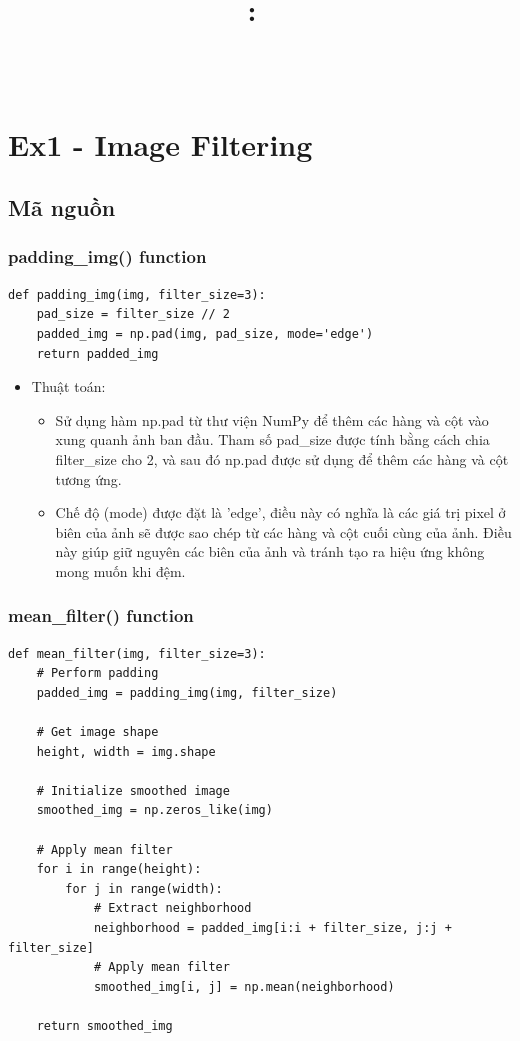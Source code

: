 \documentclass{article}
\title{
\vspace{-1in}
\textmd{\textbf{\hmwkClass:\ \hmwkTitle} \\ \hmwkAuthorName}\\
}
\author{}
\date{}
\begin{document}
\maketitle

\section{Ex1 - Image Filtering}
\subsection{Mã nguồn}
\subsubsection{padding\_img() function}
\begin{lstlisting}[caption={Code of padding\_img() function}, label={padding\_img}]
def padding_img(img, filter_size=3):
    pad_size = filter_size // 2
    padded_img = np.pad(img, pad_size, mode='edge')
    return padded_img
\end{lstlisting}

\begin{itemize}
    
    \item Thuật toán:
    \begin{itemize}
        \item Sử dụng hàm np.pad từ thư viện NumPy để thêm các hàng và cột vào xung quanh ảnh ban đầu. Tham số pad\_size được tính bằng cách chia filter\_size cho 2, và sau đó np.pad được sử dụng để thêm các hàng và cột tương ứng.
        \item Chế độ (mode) được đặt là 'edge', điều này có nghĩa là các giá trị pixel ở biên của ảnh sẽ được sao chép từ các hàng và cột cuối cùng của ảnh. Điều này giúp giữ nguyên các biên của ảnh và tránh tạo ra hiệu ứng không mong muốn khi đệm.
    \end{itemize}
\end{itemize}


\subsubsection{mean\_filter() function}
\begin{lstlisting}[caption={Code of mean\_filter() function}, label={mean\_filter()}]
def mean_filter(img, filter_size=3):
    # Perform padding
    padded_img = padding_img(img, filter_size)

    # Get image shape
    height, width = img.shape

    # Initialize smoothed image
    smoothed_img = np.zeros_like(img)

    # Apply mean filter
    for i in range(height):
        for j in range(width):
            # Extract neighborhood
            neighborhood = padded_img[i:i + filter_size, j:j + filter_size]
            # Apply mean filter
            smoothed_img[i, j] = np.mean(neighborhood)

    return smoothed_img
\end{lstlisting}
\end{document}
